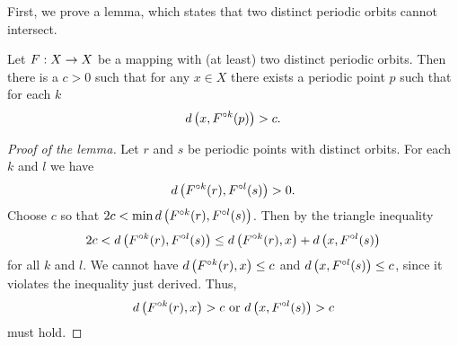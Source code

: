 \documentclass[12pt,draft,twoside]{book}
\begin{document}
First, we prove a lemma, which states that two distinct periodic orbits cannot intersect.
\begin{lemma}
  Let $F: X\rightarrow X$ be a mapping with (at least) two distinct periodic orbits.
  Then there is a $c > 0$ such that for any $x\in X$ there exists a periodic
  point $p$ such that for each $k$
  \begin{equation*}
    d\left( x, F^{\circ k}(p) \right) > c.
  \end{equation*}
  \label{lem:dev1}
  \begin{proof}[Proof of the lemma]
    Let $r$ and $s$ be periodic points with distinct orbits. For each $k$ and $l$ we have
    \begin{equation*}
      d\left( F^{\circ k}(r), F^{\circ l}(s) \right) > 0.
    \end{equation*}
    Choose $c$ so that $2c < \min d\left( F^{\circ k}(r),F^{\circ l}(s) \right)$.
    Then by the triangle inequality
    \begin{equation*}
      2c < d\left( F^{\circ k}(r),F^{\circ l}(s) \right) \leq d\left( F^{\circ k}(r),x \right) + d\left( x,F^{\circ l}(s) \right)
    \end{equation*}
    for all $k$ and $l$.
    We cannot have $d\left( F^{\circ k}(r),x \right) \leq c$ and $d\left( x,F^{\circ l}(s) \right) \leq c$, since it violates the inequality just derived.
    Thus,
    \begin{equation*}
      d\left( F^{\circ k}(r),x \right) > c \mbox{ or } d\left( x,F^{\circ l}(s) \right) > c
    \end{equation*}
    must hold.
  \end{proof}
\end{lemma}
\end{document}

